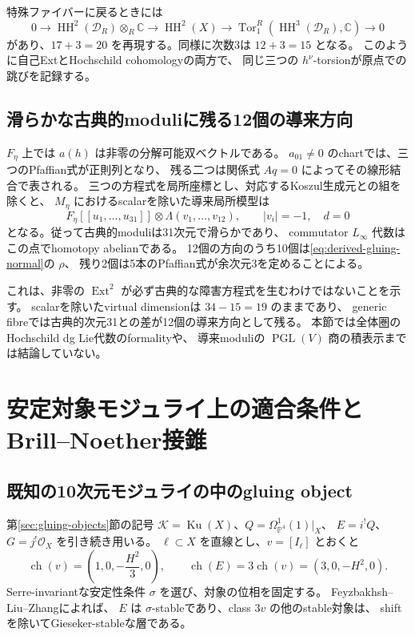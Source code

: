\documentclass[a4paper,11pt]{ltjsarticle}
\theoremstyle{definition}
\newcommand{\CC}{\mathbb C}
\newcommand{\OO}{\mathcal O}
\newcommand{\PP}{\mathbb P}
\newcommand{\Ku}{\operatorname{Ku}}
\newcommand{\HH}{\operatorname{HH}}
\newcommand{\Ext}{\operatorname{Ext}}
\begin{document}
特殊ファイバーに戻るときには
\[
 0\longrightarrow\HH^2(\mathcal D_R)\otimes_R\CC
 \longrightarrow\HH^2(X)
 \longrightarrow\operatorname{Tor}_1^R(\HH^3(\mathcal D_R),\CC)
 \longrightarrow0
\]
があり、$17+3=20$ を再現する。同様に次数3は $12+3=15$ となる。
このように自己ExtとHochschild cohomologyの両方で、
同じ三つの $h^{\nu}$-torsionが原点での跳びを記録する。

\subsection{滑らかな古典的moduliに残る12個の導来方向}

$F_\eta$ 上では $a(h)$ は非零の分解可能双ベクトルである。
$a_{01}\ne0$ のchartでは、三つのPfaffian式が正則列となり、
残る二つは関係式 $Aq=0$ によってその線形結合で表される。
三つの方程式を局所座標とし、対応するKoszul生成元との組を除くと、
$M_\eta$ におけるscalarを除いた導来局所模型は
\begin{equation}\label{eq:generic-gluing-derived}
 F_\eta[[u_1,\ldots,u_{31}]]\otimes\Lambda(v_1,\ldots,v_{12}),
 \qquad |v_i|=-1,\quad d=0
\end{equation}
となる。従って古典的moduliは31次元で滑らかであり、
commutator $L_\infty$ 代数はこの点でhomotopy abelianである。
12個の方向のうち10個は\eqref{eq:derived-gluing-normal}の $\rho$、
残り2個は5本のPfaffian式が余次元3を定めることによる。

これは、非零の $\Ext^2$ が必ず古典的な障害方程式を生むわけではないことを示す。
scalarを除いたvirtual dimensionは $34-15=19$ のままであり、
generic fibreでは古典的次元31との差が12個の導来方向として残る。
本節では全体圏のHochschild dg Lie代数のformalityや、
導来moduliの $\operatorname{PGL}(V)$ 商の積表示までは結論していない。


\section{安定対象モジュライ上の適合条件とBrill--Noether接錐}\label{sec:bn-algebraic}

\subsection{既知の10次元モジュライの中のgluing object}

第\ref{sec:gluing-objects}節の記号
$\mathcal K=\Ku(X)$、$Q=\Omega^1_{\PP^4}(1)|_X$、
$E=i^!Q$、$G=j^!\OO_X$ を引き続き用いる。
$\ell\subset X$ を直線とし、$v=[I_\ell]$ とおくと
\[
 \operatorname{ch}(v)=\left(1,0,-\frac{H^2}{3},0\right),\qquad
 \operatorname{ch}(E)=3\operatorname{ch}(v)=(3,0,-H^2,0).
\]
Serre-invariantな安定性条件 $\sigma$ を選び、対象の位相を固定する。
Feyzbakhsh--Liu--Zhang\cite[Section 3.2, Proposition 5.5]{FLZ}によれば、
$E$ は $\sigma$-stableであり、class $3v$ の他のstable対象は、
shiftを除いてGieseker-stableな層である。
\end{document}

